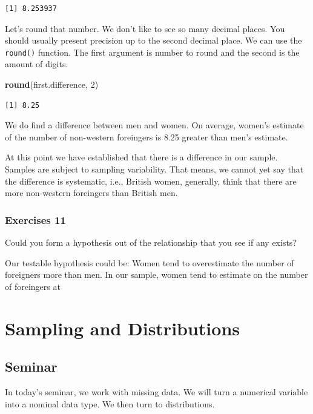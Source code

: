 \documentclass[]{book}
\newenvironment{Shaded}{\begin{snugshade}}{\end{snugshade}}
\newcommand{\KeywordTok}[1]{\textcolor[rgb]{0.13,0.29,0.53}{\textbf{#1}}}
\newcommand{\DecValTok}[1]{\textcolor[rgb]{0.00,0.00,0.81}{#1}}
\newcommand{\NormalTok}[1]{#1}
\theoremstyle{definition}
\theoremstyle{definition}
\theoremstyle{definition}
\theoremstyle{remark}
\begin{document}
\begin{verbatim}
[1] 8.253937
\end{verbatim}

Let's round that number. We don't like to see so many decimal places.
You should usually present precision up to the second decimal place. We
can use the \texttt{round()} function. The first argument is number to
round and the second is the amount of digits.

\begin{Shaded}
\begin{Highlighting}[]
\KeywordTok{round}\NormalTok{(first.difference, }\DecValTok{2}\NormalTok{)}
\end{Highlighting}
\end{Shaded}

\begin{verbatim}
[1] 8.25
\end{verbatim}

We do find a difference between men and women. On average, women's
estimate of the number of non-western foreingers is 8.25 greater than
men's estimate.

At this point we have established that there is a difference in our
sample. Samples are subject to sampling variability. That means, we
cannot yet say that the difference is systematic, i.e., British women,
generally, think that there are more non-western foreingers than British
men.

\subsection{Exercises 11}\label{exercises-11}

Could you form a hypothesis out of the relationship that you see if any
exists?

Our testable hypothesis could be: Women tend to overestimate the number
of foreigners more than men. In our sample, women tend to estimate on
the number of foreingers at

\chapter{Sampling and Distributions}\label{sampling-and-distributions}

\section{Seminar}\label{seminar-2}

In today's seminar, we work with missing data. We will turn a numerical
variable into a nominal data type. We then turn to distributions.
\end{document}
